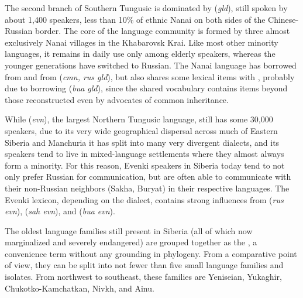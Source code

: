 The second branch of Southern Tungusic is dominated by  (\textit{gld}), still spoken by about 1,400 speakers, less than 10\% of ethnic Nanai on both sides of the Chinese-Russian border. The core of the language community is formed by three almost exclusively Nanai villages in the Khabarovsk Krai. Like most other minority languages, it remains in daily use only among elderly speakers, whereas the younger generations have switched to Russian. The Nanai language has borrowed from  and from  (\textit{cmn, rus \arrowLA gld}), but also shares some lexical items with , probably due to borrowing (\textit{bua \arrowLA gld}), since the shared vocabulary contains items beyond those reconstructed even by advocates of common inheritance.

While  (\textit{evn}), the largest Northern Tungusic language, still has some 30,000 speakers, due to its very wide geographical dispersal across much of Eastern Siberia and Manchuria it has split into many very divergent dialects, and its speakers tend to live in mixed-language settlements where they almost always form a minority. For this reason, Evenki speakers in Siberia today tend to not only prefer Russian for communication, but are often able to communicate with their non-Russian neighbors (Sakha, Buryat) in their respective languages. The Evenki lexicon, depending on the dialect, contains strong influences from  (\textit{rus  \arrowLA evn}),  (\textit{sah \arrowLA evn}), and  (\textit{bua  \arrowLA evn}).

The oldest language families still present in Siberia (all of which now marginalized and severely endangered) are grouped together as the , a convenience term without any grounding in phylogeny. From a comparative point of view, they can be split into not fewer than five small language families and isolates. From northwest to southeast, these families are Yeniseian, Yukaghir, Chukotko-Kamchatkan, Nivkh, and Ainu.

